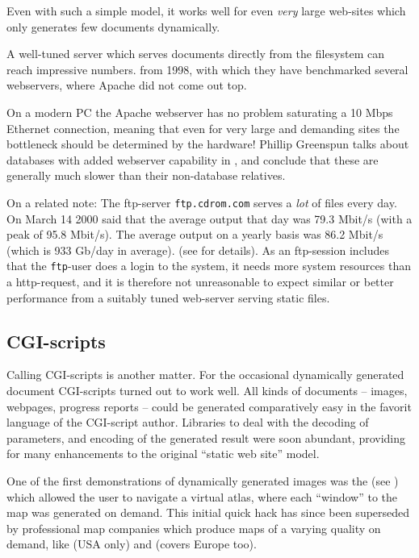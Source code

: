 Even with such a simple model, it works well for even \textit{very}
large web-sites which only generates few documents dynamically.

A well-tuned server which serves documents directly from the
filesystem can reach impressive numbers.
 from 1998, with which they have
benchmarked several webservers, where Apache did not come out top.


On a modern PC the Apache webserver has no problem saturating a 10
Mbps Ethernet connection, meaning that even for very large and
demanding sites the bottleneck should be determined by the hardware!
Phillip Greenspun talks about databases with added webserver
capability in \cite{phillipandalexsguidetowebpublishing}, and conclude
that these are generally much slower than their non-database
relatives.

On a related note: The ftp-server \texttt{ftp.cdrom.com} serves a
\textit{lot} of files every day.  On March 14 2000
 said that the average output that day was 79.3 Mbit/s
(with a peak of 95.8 Mbit/s).  The average output on a yearly basis
was 86.2 Mbit/s (which is 933 Gb/day in average).
(see  for details).  As
an ftp-session includes that the \texttt{ftp}-user does a login to the
system, it needs more system resources than a http-request, and it is
therefore not unreasonable to expect similar or better performance
from a suitably tuned web-server serving static files.


\subsection{CGI-scripts}
\label{sec:cgi-scripts}



Calling CGI-scripts is another matter.  For the occasional dynamically
generated document CGI-scripts turned out to work well.  All kinds of
documents -- images, webpages, progress reports -- could be generated
comparatively easy in the favorit language of the CGI-script author.
Libraries to deal with the decoding of parameters, and encoding of the
generated result were soon abundant, providing for many enhancements
to the original ``static web site'' model.

\label{sec:map-generation-first-web-application} One of the first
demonstrations of dynamically generated images was the
 (see
) which allowed the user to navigate a
virtual atlas, where each ``window'' to the map was generated on
demand.  This initial quick hack has since been superseded by
professional map companies which produce maps of a varying quality on
demand, like  (USA
only) and  (covers Europe
too).


